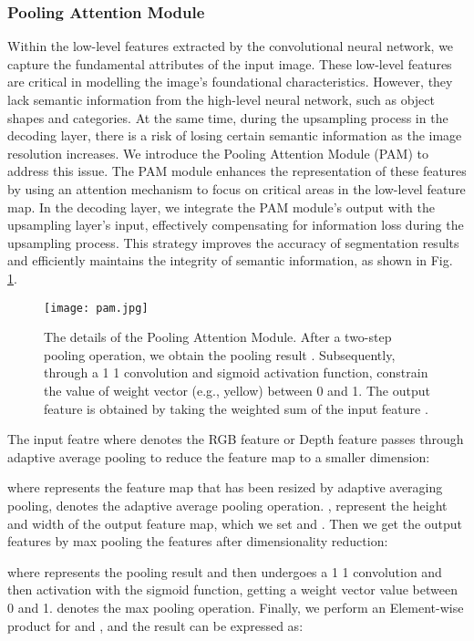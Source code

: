 \documentclass{aims}
\numberwithin{equation}{section}
\begin{document}
\subsubsection{Pooling Attention Module}
Within the low-level features extracted by the convolutional neural network, we capture the fundamental attributes of the input image. These low-level features are critical in modelling the image's foundational characteristics. However, they lack semantic information from the high-level neural network, such as object shapes and categories. At the same time, during the upsampling process in the decoding layer, there is a risk of losing certain semantic information as the image resolution increases. We introduce the Pooling Attention Module (PAM) to address this issue. The PAM module enhances the representation of these features by using an attention mechanism to focus on critical areas in the low-level feature map. In the decoding layer, we integrate the PAM module's output with the upsampling layer's input, effectively compensating for information loss during the upsampling process. This strategy improves the accuracy of segmentation results and efficiently maintains the integrity of semantic information, as shown in Fig. \ref{fig:pam}.

\begin{figure}[t]
	\centering
		\centering
\centering
\texttt{[image: pam.jpg]}
\caption{The details of the Pooling Attention Module. After a two-step pooling operation, we obtain the pooling result . Subsequently, through a 1  1 convolution and sigmoid activation function, constrain the value of weight vector  (e.g., yellow) between 0 and 1. The output feature  is obtained by taking the weighted sum of the input feature .\label{fig:pam}}
\end{figure}

The input featre  where  denotes the RGB feature or Depth feature passes through adaptive average pooling to reduce the feature map to a smaller dimension:


where  represents the feature map that has been resized by adaptive averaging pooling,  denotes the adaptive average pooling operation. , represent the height and width of the output feature map, which we set  and . Then we get the output features  by max pooling the features after dimensionality reduction:

where  represents the pooling result and then  undergoes a 1  1 convolution and then activation with the sigmoid function, getting a weight vector   value between 0 and 1.  denotes the max pooling operation. Finally, we perform an Element-wise product for  and , and the result  can be expressed as:
\end{document}

